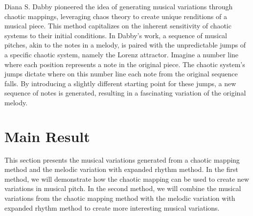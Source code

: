 \documentclass[11pt]{article}
\theoremstyle{definition}
\DeclareMathOperator{\dom}{dom}
\begin{document}
Diana S. Dabby \cite{dabby_musical_1996} pioneered the idea of generating musical variations through chaotic mappings, leveraging chaos theory to create unique renditions of a musical piece. This method capitalizes on the inherent sensitivity of chaotic systems to their initial conditions. In Dabby's work, a sequence of musical pitches, akin to the notes in a melody, is paired with the unpredictable jumps of a specific chaotic system, namely the Lorenz attractor. Imagine a number line where each position represents a note in the original piece. The chaotic system's jumps dictate where on this number line each note from the original sequence falls. By introducing a slightly different starting point for these jumps, a new sequence of notes is generated, resulting in a fascinating variation of the original melody.

\section{Main Result}
\label{sec: mainresult}
This section presents the musical variations generated from a chaotic mapping method and the melodic variation with expanded rhythm method. In the first method, we will demonstrate how the chaotic mapping can be used to create new variations in musical pitch. In the second method, we will combine the musical variations from the chaotic mapping method with the melodic variation with expanded rhythm method to create more interesting musical variations.
\end{document}
